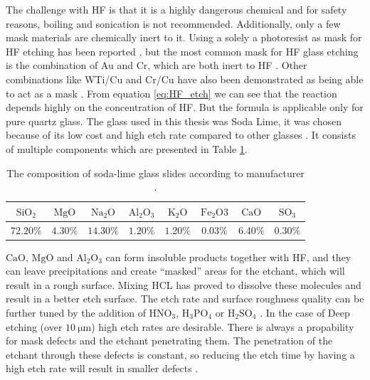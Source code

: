 \documentclass[draft]{jyflluk}
\begin{document}
The challenge with HF is that it is a highly dangerous chemical and for safety reasons, boiling and sonication is not recommended. Additionally, only a few mask materials are chemically inert to it.  Using a solely a photoresist as mask for HF etching has been reported \cite{lin2001fast,guanglong2012microfluidic}, but the most common mask for HF glass etching is the combination of Au and Cr, which are both inert to HF \cite{iliescu2005characterization,tay2006defect}. Other combinations like WTi/Cu and Cr/Cu have also been demonstrated as being able to act as a mask \cite{Hgglund2013CharacterizationOM,iliescu2008wet}.
From equation \ref{eq:HF_etch} we can see that the reaction depends highly on the concentration of HF. But the formula is applicable only for pure quartz glass. The glass used in this thesis was Soda Lime, it was chosen because of its low cost and high etch rate compared to other glasses \cite{srivannavit2004design}. It consists of multiple components which are presented in Table \ref{tab:soda_lime}. 
\begin{table}[h]
    \centering
    \caption{The composition of soda-lime glass slides according to manufacturer \cite{Soda_lime_ONLINE}.}
    \label{tab:soda_lime}
    \begin{tabular}{cccccccc} \toprule
       $\mathrm{SiO_2}$  & $\mathrm{MgO}$   &  $\mathrm{Na_2 O}$ & $\mathrm{Al_2 O_3}$ &  $\mathrm{K_2 O}$ &  $\mathrm{Fe_2O3}$ &  $\mathrm{CaO}$ & $\mathrm{SO_3}$ \\ \midrule

       $72.20 \percent$  &  $4.30 \percent$ &  $14.30 \percent$  & $1.20 \percent$     &  $1.20 \percent$  & $0.03 \percent$    & $6.40 \percent$ & $0.30 \percent$\\ \bottomrule
    \end{tabular}
\end{table} 
$\mathrm{CaO}$, $\mathrm{MgO}$ and $\mathrm{Al_2 O_3}$ can form insoluble products together with HF, and they can leave precipitations and create “masked” areas for the etchant, which will result in a rough surface. Mixing HCL has proved to dissolve these molecules and result in a better etch surface\cite{iliescu2005characterization}. The etch rate and surface roughness quality can be further tuned by the addition of $\mathrm{HNO_3}$, $\mathrm{H_3 PO_4 }$  or $\mathrm{H_2SO_4}$ \cite{park2017review}. In the case of Deep etching (over $\SI{10}{\micro \metre}$) high etch rates are desirable. There is always a propability for mask defects and the etchant penetrating them. The penetration of the etchant through these defects is constant, so reducing the etch time by having a high etch rate will result in smaller defects \cite{tay2006defect}.
\end{document}
